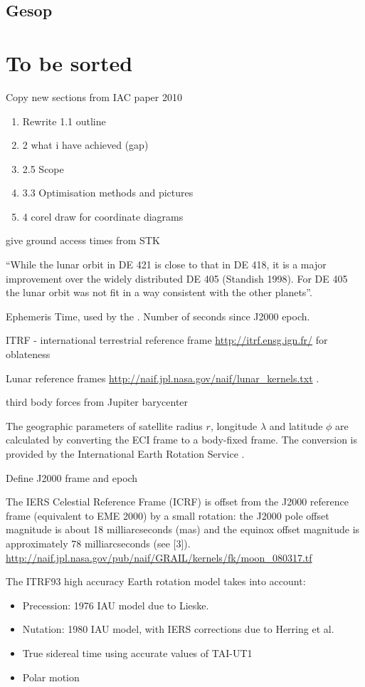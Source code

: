 \subsection{Gesop}

\section{To be sorted}

Copy new sections from IAC paper 2010 \textcite{Shimmin2010}

\begin{enumerate}
\item Rewrite 1.1 outline
\item 2 what i have achieved (gap)
\item 2.5 Scope
\item 3.3 Optimisation methods and pictures
\item 4 corel draw for coordinate diagrams
\end{enumerate}

give ground access times from STK

\enquote{While the lunar orbit in DE 421 is close to that in DE 418, it is a major improvement over the widely distributed DE 405 (Standish 1998). For DE 405 the lunar orbit was not fit in a way consistent with the other planets}\cite{DE421}.

Ephemeris Time, used by the \textcite{NAIF2010}. Number of seconds since J2000 epoch.


ITRF - international terrestrial reference frame \url{http://itrf.ensg.ign.fr/} for oblateness

Lunar reference frames \url{http://naif.jpl.nasa.gov/naif/lunar_kernels.txt} \textcite{LCF}.

third body forces from Jupiter barycenter

The geographic parameters of satellite radius $r$, longitude $\lambda$ and latitude $\phi$ are calculated by converting the ECI frame to a body-fixed frame. The conversion is provided by the International Earth Rotation Service \parencite{Petit2010}.

Define J2000 frame and epoch

The IERS Celestial Reference Frame (ICRF) is offset from the J2000 reference frame (equivalent to EME 2000) by a small rotation:  the J2000 pole offset magnitude is about 18 milliarcseconds (mas) and the equinox offset magnitude is approximately 78 milliarcseconds (see [3]). \url{http://naif.jpl.nasa.gov/pub/naif/GRAIL/kernels/fk/moon_080317.tf}

The ITRF93 high accuracy Earth rotation model takes into account:
\begin{itemize}
\item Precession: 1976 IAU model due to Lieske.
\item  Nutation: 1980 IAU model, with IERS corrections due to Herring et al.
\item  True sidereal time using accurate values of TAI-UT1
\item  Polar motion
\end{itemize}
